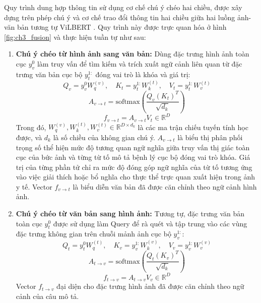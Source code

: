 Quy trình dung hợp thông tin sử dụng cơ chế chú ý chéo hai chiều, được xây dựng trên phép chú ý \cite{Vaswani2017Attention} và cơ chế trao đổi thông tin hai chiều giữa hai luồng ảnh-văn bản tương tự ViLBERT \cite{Lu2019ViLBERT}. Quy trình này được trực quan hóa ở hình \ref{fig:ch3_fusion} và thực hiện tuần tự như sau:
\pagebreak
\begin{enumerate}
    \item \textbf{Chú ý chéo từ hình ảnh sang văn bản:}
    Dùng đặc trưng hình ảnh toàn cục $y_v^0$ làm truy vấn để tìm kiếm và trích xuất ngữ cảnh liên quan từ đặc trưng văn bản cục bộ $y_t^{1:}$ đóng vai trò là khóa và giá trị:
    \begin{equation}
    Q_v = y_v^0 W_q^{(v)}, \quad K_t = y_t^{1:} W_k^{(t)}, \quad V_t = y_t^{1:} W_v^{(t)}
    \end{equation}
    \begin{equation}
    A_{v \to t} = \text{softmax}\left(\frac{Q_v (K_t)^T}{\sqrt{d_k}}\right)
    \end{equation}
    \begin{equation}
    f_{v \to t} = A_{v \to t} V_t \in \mathbb{R}^D
    \end{equation}
    Trong đó, $W_q^{(v)}, W_k^{(t)}, W_v^{(t)} \in \mathbb{R}^{D \times d_k}$ là các ma trận chiếu tuyến tính học được, và $d_k$ là số chiều của không gian chú ý. $A_{v \to t}$ là biểu thị phân phối trọng số thể hiện mức độ tương quan ngữ nghĩa giữa truy vấn thị giác toàn cục của bức ảnh và từng từ tố mô tả bệnh lý cục bộ đóng vai trò khóa. Giá trị của từng phần tử chỉ ra mức độ đóng góp ngữ nghĩa của từ tố tương ứng vào việc giải thích hoặc bổ nghĩa cho thực thể trực quan xuất hiện trong ảnh y tế. Vector $f_{v \to t}$ là biểu diễn văn bản đã được căn chỉnh theo ngữ cảnh hình ảnh.

    \item \textbf{Chú ý chéo từ văn bản sang hình ảnh:}
    Tương tự, đặc trưng văn bản toàn cục $y_t^0$ được sử dụng làm Query để rà quét và tập trung vào các vùng đặc trưng không gian trên chuỗi mảnh ảnh cục bộ $y_v^{1:}$:
    \begin{equation}
    Q_t = y_t^0 W_q^{(t)}, \quad K_v = y_v^{1:} W_k^{(v)}, \quad V_v = y_v^{1:} W_v^{(v)}
    \end{equation}
    \begin{equation}
    A_{t \to v} = \text{softmax}\left(\frac{Q_t (K_v)^T}{\sqrt{d_k}}\right)
    \end{equation}
    \begin{equation}
    f_{t \to v} = A_{t \to v} V_v \in \mathbb{R}^D
    \end{equation}
    Vector $f_{t \to v}$ đại diện cho đặc trưng hình ảnh đã được căn chỉnh theo ngữ cảnh của câu mô tả.


\end{enumerate}
